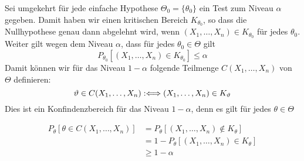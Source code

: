 \begin{mdframed}
Sei umgekehrt für jede einfache Hypothese $\Theta_0 = \{\theta_0\}$ ein Test zum Niveau $\alpha$ gegeben. Damit haben wir einen kritischen Bereich $K_{\theta_0}$, so dass die Nullhypothese genau dann abgelehnt wird, wenn $(X_1,\dots,X_n) \in K_{\theta_0}$ für jedes $\theta_0$. Weiter gilt wegen dem Niveau $\alpha$, dass für jedes $\theta_0 \in \Theta$ gilt
$$ P_{\theta_0} [(X_1,\dots, X_n) \in K_{\theta_0}] \leq \alpha$$
Damit können wir für das Niveau $1-\alpha$ folgende Teilmenge $C(X_1,\dots, X_n)$ von $\Theta$ definieren:
$$ \vartheta \in C(X_1,\dots, X_n) :\Longleftrightarrow (X_1,\dots, X_n) \in K_\vartheta$$
Dies ist ein Konfindenzbereich für das Niveau $1-\alpha$, denn es gilt für jedes $\theta \in \Theta$

\begin{align*}
	P_\theta [\theta \in C(X_1,\dots,X_n)] &= P_\theta [(X_1,\dots, X_n) \notin K_\theta]\\&= 1 - P_\theta [(X_1,\dots, X_n) \in K_\theta]\\&\geq 1 - \alpha
\end{align*}


\end{mdframed}